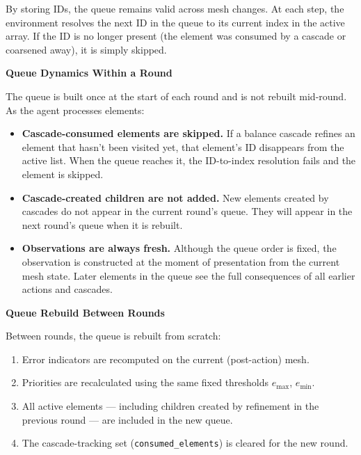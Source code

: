 \documentclass[11pt]{article}
\begin{document}
By storing IDs, the queue remains valid across mesh changes. At each step, the environment resolves the next ID in the queue to its current index in the active array. If the ID is no longer present (the element was consumed by a cascade or coarsened away), it is simply skipped.

\vspace{0.5cm}
\noindent\textbf{\textcolor{roundcolor}{Queue Dynamics Within a Round}}

\vspace{0.15cm}
\noindent The queue is built once at the start of each round and is not rebuilt mid-round. As the agent processes elements:

\begin{itemize}[leftmargin=1.5em, itemsep=4pt]
    \item \textbf{Cascade-consumed elements are skipped.} If a balance cascade refines an element that hasn't been visited yet, that element's ID disappears from the active list. When the queue reaches it, the ID-to-index resolution fails and the element is skipped.
    \item \textbf{Cascade-created children are not added.} New elements created by cascades do not appear in the current round's queue. They will appear in the next round's queue when it is rebuilt.
    \item \textbf{Observations are always fresh.} Although the queue order is fixed, the observation is constructed at the moment of presentation from the current mesh state. Later elements in the queue see the full consequences of all earlier actions and cascades.
\end{itemize}

\vspace{0.5cm}
\noindent\textbf{\textcolor{roundcolor}{Queue Rebuild Between Rounds}}

\vspace{0.15cm}
\noindent Between rounds, the queue is rebuilt from scratch:
\begin{enumerate}[leftmargin=1.5em, itemsep=3pt]
    \item Error indicators are recomputed on the current (post-action) mesh.
    \item Priorities are recalculated using the same fixed thresholds $e_{\max}$, $e_{\min}$.
    \item All active elements --- including children created by refinement in the previous round --- are included in the new queue.
    \item The cascade-tracking set (\texttt{consumed\_elements}) is cleared for the new round.
\end{enumerate}
\end{document}
